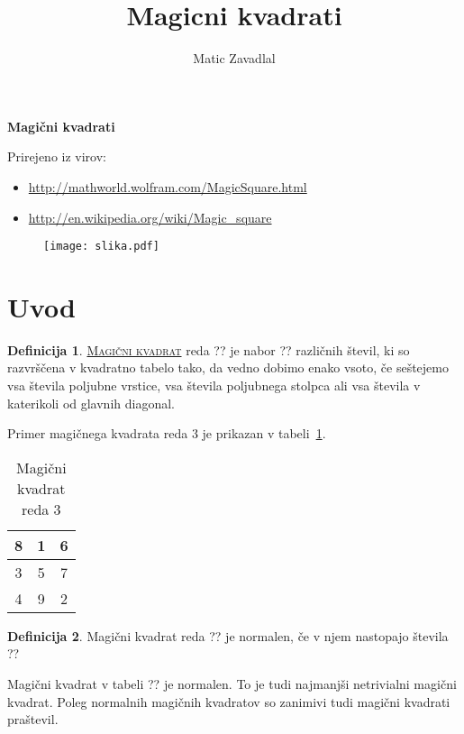 \documentclass[a4paper,12pt]{article}
\title{Magicni kvadrati}
\author{Matic Zavadlal}
\theoremstyle{definition}
\newtheorem{defn}{Definicija}
\theoremstyle{plain}
\newcommand{\pojem}[1]{
   \underline{\textsc{#1}}
}
\newenvironment{magic}[3]{
   \begin{table}[h!]
      \caption{#2}
      \centering
      \large
      \label{tbl:#3}
         \begin{tabular}{|*#1{c|}}
            \hline
}{
      \end{tabular}
   \end{table}
}
\begin{document}

\begin{center}
   \LARGE\textbf {Magični kvadrati}
\end{center}


Prirejeno iz virov:
\begin{itemize}[leftmargin=1.6cm]
   \item \url {http://mathworld.wolfram.com/MagicSquare.html}
   \item \url {http://en.wikipedia.org/wiki/Magic_square}
\end{itemize}

\begin{figure}[h]
   \centering
   \texttt{[image: slika.pdf]}
   \label{fig:slika}
\end{figure}

\tableofcontents


\newpage


\section{Uvod}


\begin{defn}
   \pojem{Magični kvadrat} reda ?? je nabor ?? različnih števil,
   ki so razvrščena v kvadratno tabelo tako, da vedno dobimo enako vsoto,
   če seštejemo vsa števila poljubne vrstice, vsa števila poljubnega
   stolpca ali vsa števila v katerikoli od glavnih diagonal.
   
   \noindent Primer magičnega kvadrata reda 3 je prikazan v tabeli~\ref{tbl:kvadrat3}.

   \begin{magic}{3}{Magični kvadrat reda 3}{kvadrat3}
      8 & 1 & 6 \\\hline
      3 & 5 & 7 \\\hline
      4 & 9 & 2 \\\hline
   \end{magic}

\end{defn}

\begin{defn}

   Magični kvadrat reda ?? je normalen, če v njem nastopajo števila
   ??

   Magični kvadrat v tabeli ?? je normalen.
   To je tudi najmanjši netrivialni magični kvadrat.
   Poleg normalnih magičnih kvadratov so zanimivi tudi magični kvadrati praštevil.

\end{defn}
\end{document}
